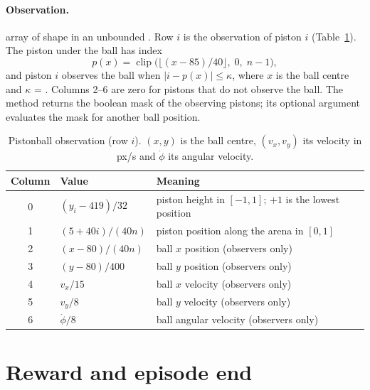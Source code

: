 \paragraph{Observation.}  array of shape  in an
unbounded . Row $i$ is the observation of piston $i$
(Table~\ref{tab:pistonball-obs}). The piston under the ball has index
\begin{equation}
  p(x) = \operatorname{clip}\bigl(\lfloor (x - 85)/40 \rfloor,\; 0,\; n - 1\bigr),
\end{equation}
and piston $i$ observes the ball when $|i - p(x)| \le \kappa$, where $x$ is the
ball centre and $\kappa$ = . Columns 2--6 are zero for pistons that
do not observe the ball. The method  returns the
boolean mask of the observing pistons; its optional argument 
evaluates the mask for another ball position.

\begin{table}[htbp]
  \centering\small
  \caption{Pistonball observation (row $i$). $(x, y)$ is the ball centre,
    $(v_x, v_y)$ its velocity in px/s and $\dot\phi$ its angular velocity.}
  \label{tab:pistonball-obs}
  \begin{tabularx}{\textwidth}{@{}cl>{\raggedright\arraybackslash}X@{}}
    \toprule
    Column & Value & Meaning \\
    \midrule
    0 & $(y_i - 419)/32$ & piston height in $[-1, 1]$; $+1$ is the lowest position \\
    1 & $(5 + 40i)/(40n)$ & piston position along the arena in $[0, 1]$ \\
    2 & $(x - 80)/(40n)$ & ball $x$ position (observers only) \\
    3 & $(y - 80)/400$ & ball $y$ position (observers only) \\
    4 & $v_x / 15$ & ball $x$ velocity (observers only) \\
    5 & $v_y / 8$ & ball $y$ velocity (observers only) \\
    6 & $\dot\phi / 8$ & ball angular velocity (observers only) \\
    \bottomrule
  \end{tabularx}
\end{table}

\section{Reward and episode end}\label{sec:pistonball-reward}

